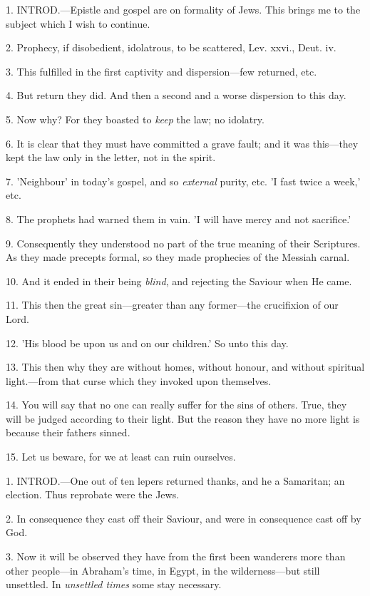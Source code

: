 1. INTROD.—Epistle
and gospel are on formality of Jews. This brings me to the subject
which I wish to continue.

2. Prophecy, if disobedient, idolatrous, to be
scattered, Lev. xxvi., Deut. iv.

3. This fulfilled in the first captivity and
dispersion—few returned, etc.

4. But return they did. And then a second and a
worse dispersion to this day.

5. Now why? For they boasted to \emph{keep} the
law; no idolatry.

6. It is clear that they must have committed a
grave fault; and it was this—they kept the law only in the letter,
not in the spirit.

7. 'Neighbour' in today's gospel, and so \emph{external}
purity, etc. 'I fast twice a week,' etc.

8. The prophets had warned them in vain. 'I will
have mercy and not sacrifice.'

9. Consequently they understood no part of the
true meaning of their Scriptures. As they made precepts formal, so
they made prophecies of the Messiah carnal.

10. And it ended in their being \emph{blind}, and
rejecting the Saviour when He came.

11. This then the great sin—greater than any
former—the crucifixion of our Lord.

12. 'His blood be upon us and on our children.'
So unto this day.

13. This then why they are without homes, without
honour, and without spiritual light.—from that curse which they
invoked upon themselves.

14. You will say that no one can really suffer
for the sins of others. True, they will be judged according to their
light. But the reason they have no more light is because their fathers
sinned.

15. Let us beware, for we at least can ruin
ourselves.


1. INTROD.—One
out of ten lepers returned thanks, and he a Samaritan; an election.
Thus reprobate were the Jews.

2. In consequence they cast off their Saviour,
and were in consequence cast off by God.

3. Now it will be observed they have from the
first been wanderers more than other people—in Abraham's time, in
Egypt, in the wilderness—but still unsettled. In \emph{unsettled times}
some stay necessary.

